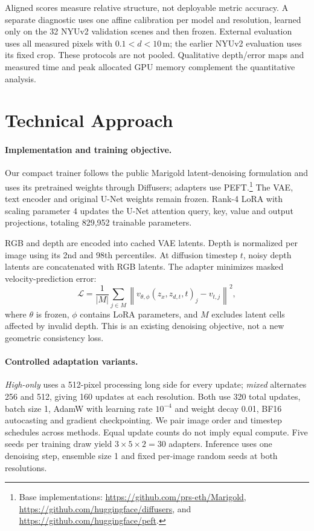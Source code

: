 Aligned scores measure relative structure, not deployable metric accuracy. A separate diagnostic uses one affine calibration per model and resolution, learned only on the 32 NYUv2 validation scenes and then frozen. External evaluation uses all measured pixels with $0.1<d<10$\,m; the earlier NYUv2 evaluation uses its fixed crop. These protocols are not pooled. Qualitative depth/error maps and measured time and peak allocated GPU memory complement the quantitative analysis.

\section{Technical Approach}
\paragraph{Implementation and training objective.}
Our compact trainer follows the public Marigold latent-denoising formulation and uses its pretrained weights through Diffusers; adapters use PEFT.\footnote{Base implementations: \url{https://github.com/prs-eth/Marigold}, \url{https://github.com/huggingface/diffusers}, and \url{https://github.com/huggingface/peft}.} The VAE, text encoder and original U-Net weights remain frozen. Rank-4 LoRA with scaling parameter 4 updates the U-Net attention query, key, value and output projections, totaling 829,952 trainable parameters.

RGB and depth are encoded into cached VAE latents. Depth is normalized per image using its 2nd and 98th percentiles. At diffusion timestep $t$, noisy depth latents are concatenated with RGB latents. The adapter minimizes masked velocity-prediction error:
\begin{equation}
\mathcal L=\frac{1}{|M|}\sum_{j\in M}\left\|v_{\theta,\phi}(z_x,z_{d,t},t)_j-v_{t,j}\right\|^2,
\end{equation}
where $\theta$ is frozen, $\phi$ contains LoRA parameters, and $M$ excludes latent cells affected by invalid depth. This is an existing denoising objective, not a new geometric consistency loss.

\paragraph{Controlled adaptation variants.}
\textit{High-only} uses a 512-pixel processing long side for every update; \textit{mixed} alternates 256 and 512, giving 160 updates at each resolution. Both use 320 total updates, batch size 1, AdamW with learning rate $10^{-4}$ and weight decay 0.01, BF16 autocasting and gradient checkpointing. We pair image order and timestep schedules across methods. Equal update counts do not imply equal compute. Five seeds per training draw yield $3\times5\times2=30$ adapters. Inference uses one denoising step, ensemble size 1 and fixed per-image random seeds at both resolutions.

